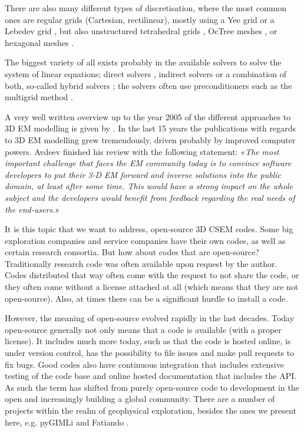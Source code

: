\documentclass[
    paper,
  ]{geophysics}
\begin{document}
There are also many different types of discretisation, where the most common
ones are regular grids (Cartesian, rectilinear), mostly using a Yee grid
\citep{IEEE.66.Yee} or a Lebedev grid \citep{CMMP.64.Lebedev}, but also
unstructured tetrahedral grids \citep{SEG.16.Zhang, CAG.17.Cai}, OcTree meshes
\citep{ECP.07.Haber}, or hexagonal meshes \citep{CAG.14.Cai}.

The biggest variety of all exists probably in the available solvers to solve
the system of linear equations; direct solvers \citep{GEO.09.Streich,
GEO.15.Grayver, GP.14.Chung, GEO.14.Jaysaval, SEG.15.Oh, GJI.18.Wang}, indirect
solvers \citep{GP.06.Mulder, GJI.15.Jaysaval} or a combination of both,
so-called hybrid solvers \citep{GEO.18.Liu}; the solvers often use
preconditioners such as the multigrid method \citep{SIAM.02.Aruliah,
GP.06.Mulder, GJI.16.Jaysaval}.

A very well written overview up to the year 2005 of the different approaches to
3D EM modelling is given by \cite{SG.05.Avdeev}. In the last 15 years the
publications with regards to 3D EM  modelling grew tremendously, driven
probably by improved computer powers. Avdeev finished his review with the
following statement: «\emph{The most important challenge that faces the EM
community today is to convince software developers to put their 3-D EM forward
and inverse solutions into the public domain, at least after some time. This
would have a strong impact on the whole subject and the developers would
benefit from feedback regarding the real needs of the end-users.}»

It is this topic that we want to address, open-source 3D CSEM codes. Some big
exploration companies and service companies have their own codes, as well as
certain research consortia. But how about codes that are open-source?
Traditionally research code was often available upon request by the author.
Codes distributed that way often come with the request to not share the code,
or they often come without a license attached at all (which means that they are
not open-source). Also, at times there can be a significant hurdle to install
a code.

However, the meaning of open-source evolved rapidly in the last decades. Today
open-source generally not only means that a code is available (with a proper
license). It includes much more today, such as that the code is hosted online,
is under version control, has the possibility to file issues and make pull
requests to fix bugs. Good codes also have continuous integration that includes
extensive testing of the code base and online hosted documentation that
includes the API. As such the term has shifted from purely open-source code
to development in the open and increasingly building a global community. There
are a number of projects within the realm of geophysical exploration, besides
the ones we present here, e.g. pyGIMLi \citep{CAG.17.Rucker} and Fatiando
\citep{JOSS.18.Uieda}.
\end{document}
